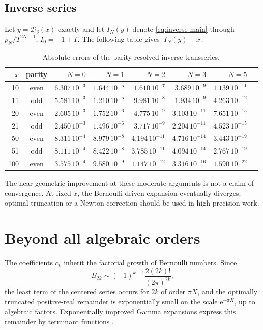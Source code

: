 \documentclass[11pt,oneside]{article}
\theoremstyle{plain}
\theoremstyle{definition}
\theoremstyle{remark}
\newcommand{\e}{\mathrm e}
\newcommand{\DF}{\mathcal D}
\begin{document}
\subsection{Inverse series}

Let \(y=\DF_\delta(x)\) exactly and let \(I_N(y)\) denote
\cref{eq:inverse-main} through \(p_N/T^{2N-1}\); \(I_0=-1+T\).
The following table gives \(|I_N(y)-x|\).
\begin{table}[htbp]
\centering
\small
\begin{tabular}{rcrrrrrr}
\toprule
\(x\)&parity&\(N=0\)&\(N=1\)&\(N=2\)&\(N=3\)&\(N=5\)\\
\midrule
10&even&\(6.307\,10^{-3}\)&\(1.644\,10^{-5}\)&\(1.610\,10^{-7}\)&\(3.689\,10^{-9}\)&\(1.139\,10^{-11}\)\\
11&odd &\(5.581\,10^{-3}\)&\(1.210\,10^{-5}\)&\(9.981\,10^{-8}\)&\(1.934\,10^{-9}\)&\(4.263\,10^{-12}\)\\
20&even&\(2.605\,10^{-3}\)&\(1.752\,10^{-6}\)&\(4.775\,10^{-9}\)&\(3.103\,10^{-11}\)&\(7.651\,10^{-15}\)\\
21&odd &\(2.450\,10^{-3}\)&\(1.496\,10^{-6}\)&\(3.717\,10^{-9}\)&\(2.204\,10^{-11}\)&\(4.523\,10^{-15}\)\\
50&even&\(8.311\,10^{-4}\)&\(8.979\,10^{-8}\)&\(4.194\,10^{-11}\)&\(4.716\,10^{-14}\)&\(3.443\,10^{-19}\)\\
51&odd &\(8.111\,10^{-4}\)&\(8.422\,10^{-8}\)&\(3.785\,10^{-11}\)&\(4.094\,10^{-14}\)&\(2.767\,10^{-19}\)\\
100&even&\(3.575\,10^{-4}\)&\(9.580\,10^{-9}\)&\(1.147\,10^{-12}\)&\(3.316\,10^{-16}\)&\(1.590\,10^{-22}\)\\
\bottomrule
\end{tabular}
\caption{Absolute errors of the parity-resolved inverse transseries.}
\label{tab:inverse-errors}
\end{table}

The near-geometric improvement at these moderate arguments is not a claim of
convergence.  At fixed \(x\), the Bernoulli-driven expansion eventually
diverges; optimal truncation or a Newton correction should be used in high
precision work.

\section{Beyond all algebraic orders}
\label{sec:beyond-all-orders}

The coefficients \(c_k\) inherit the factorial growth of Bernoulli numbers.
Since
\begin{equation}
 B_{2k}\sim(-1)^{k-1}\frac{2(2k)!}{(2\pi)^{2k}},
 \label{eq:bernoulli-growth}
\end{equation}
the least term of the centered series occurs for \(2k\) of order \(\pi X\),
and the optimally truncated positive-real remainder is exponentially small on
the scale \(\e^{-\pi X}\), up to algebraic factors.  Exponentially improved
Gamma expansions express this remainder by terminant functions
\cite{NemesGamma}.
\end{document}
